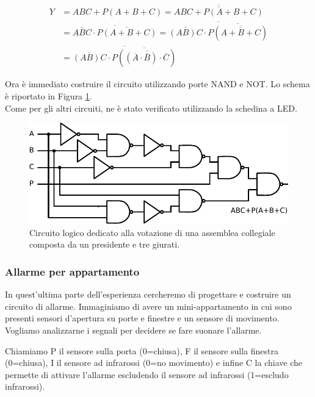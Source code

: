 \vspace{-1mm}
\begin{minipage}{0.6\textwidth}
\begin{align}
Y 	&= ABC+P(A+B+C)
	= \overline{\overline{ABC+P(A+B+C)}} \nonumber \\
	&= \overline{\overline{ABC} \cdot \overline {P(A+B+C)} }
	= \overline{\overline{(AB)C} \cdot \overline {P(\overline{\overline{{A+B+C}} })}} \nonumber \\
	&= \overline{\overline{(AB)C} \cdot \overline {P(\overline{{(\overline A \cdot \overline B) \cdot \overline C} })}} \nonumber
\end{align}
\end{minipage}
\vspace{3mm}

Ora è immediato costruire il circuito utilizzando porte NAND e NOT.
Lo schema è riportato in Figura \ref{cir9:giudici}.\\
Come per gli altri circuiti, ne è stato verificato utilizzando la schedina a LED. 

\begin{figure}[htpc]
\centering
\includegraphics[width=.75\textwidth]{../E09/latex/giudici.pdf}
\caption{Circuito logico dedicato alla votazione di una assemblea collegiale composta da un presidente e tre giurati.}
\label{cir9:giudici}
\end{figure}

\subsubsection{Allarme per appartamento}

In quest'ultima parte dell'esperienza cercheremo di progettare e costruire un circuito di allarme.
Immaginiamo di avere un mini-appartamento in cui sono presenti sensori d'apertura su porte e finestre e un sensore di movimento.
Vogliamo analizzarne i segnali per decidere se fare suonare l'allarme.

Chiamiamo P il sensore sulla porta (0=chiusa), F il sensore sulla finestra (0=chiusa), I il sensore ad infrarossi (0=no movimento) e infine C la chiave che permette di attivare l'allarme escludendo il sensore ad infrarossi (1=escludo infrarossi).

